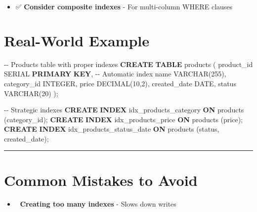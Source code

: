 \documentclass[
]{report}
\newenvironment{Shaded}{\begin{snugshade}}{\end{snugshade}}
\newcommand{\CommentTok}[1]{\textcolor[rgb]{0.37,0.37,0.37}{#1}}
\newcommand{\DataTypeTok}[1]{\textcolor[rgb]{0.68,0.00,0.00}{#1}}
\newcommand{\DecValTok}[1]{\textcolor[rgb]{0.68,0.00,0.00}{#1}}
\newcommand{\KeywordTok}[1]{\textcolor[rgb]{0.00,0.23,0.31}{\textbf{#1}}}
\newcommand{\NormalTok}[1]{\textcolor[rgb]{0.00,0.23,0.31}{#1}}
\providecommand{\tightlist}{%
  \setlength{\itemsep}{0pt}\setlength{\parskip}{0pt}}\usepackage{longtable,booktabs,array}
\begin{document}
\begin{itemize}
\tightlist
\item
  ✅ \textbf{Consider composite indexes} - For multi-column WHERE
  clauses
\end{itemize}

\section{Real-World Example}\label{real-world-example}

\begin{Shaded}
\begin{Highlighting}[]
\CommentTok{{-}{-} Products table with proper indexes}
\KeywordTok{CREATE} \KeywordTok{TABLE}\NormalTok{ products (}
\NormalTok{    product\_id SERIAL }\KeywordTok{PRIMARY} \KeywordTok{KEY}\NormalTok{,  }\CommentTok{{-}{-} Automatic index}
\NormalTok{    name }\DataTypeTok{VARCHAR}\NormalTok{(}\DecValTok{255}\NormalTok{),}
\NormalTok{    category\_id }\DataTypeTok{INTEGER}\NormalTok{,}
\NormalTok{    price }\DataTypeTok{DECIMAL}\NormalTok{(}\DecValTok{10}\NormalTok{,}\DecValTok{2}\NormalTok{),}
\NormalTok{    created\_date }\DataTypeTok{DATE}\NormalTok{,}
\NormalTok{    status }\DataTypeTok{VARCHAR}\NormalTok{(}\DecValTok{20}\NormalTok{)}
\NormalTok{);}

\CommentTok{{-}{-} Strategic indexes}
\KeywordTok{CREATE} \KeywordTok{INDEX}\NormalTok{ idx\_products\_category }\KeywordTok{ON}\NormalTok{ products (category\_id);}
\KeywordTok{CREATE} \KeywordTok{INDEX}\NormalTok{ idx\_products\_price }\KeywordTok{ON}\NormalTok{ products (price);}
\KeywordTok{CREATE} \KeywordTok{INDEX}\NormalTok{ idx\_products\_status\_date }\KeywordTok{ON}\NormalTok{ products (status, created\_date);}
\end{Highlighting}
\end{Shaded}

\begin{center}\rule{0.5\linewidth}{0.5pt}\end{center}

\section{Common Mistakes to Avoid}\label{common-mistakes-to-avoid}

\begin{itemize}
\tightlist
\item
  🚫 \textbf{Creating too many indexes} - Slows down writes
\end{itemize}
\end{document}
